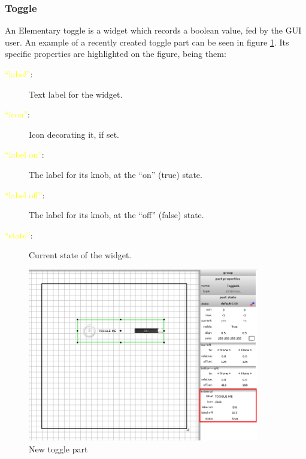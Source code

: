 \documentclass[a4paper]{profusion}
\newcommand{\GUIEditable}[1]{\textcolor{yellow}{#1}} %
\begin{document}
\subsubsection{Toggle}

An Elementary toggle is a widget which records a boolean value, fed by the
GUI user. An example of a recently created toggle part can be seen in figure
\ref{fig:new_toggle}. Its specific properties are highlighted on the
figure, being them:

\begin{description}
  \item[\GUIEditable{``label''}:] Text label for the widget.
  \item[\GUIEditable{``icon''}:] Icon decorating it, if set.
  \item[\GUIEditable{``label on''}:] The label for its knob, at the
    ``on'' (true) state.
  \item[\GUIEditable{``label off''}:] The label for its knob, at the
    ``off'' (false) state.
  \item[\GUIEditable{``state''}:] Current state of the widget.
\end{description}

\begin{figure}[h!]
  \centering
  \includegraphics[width=0.9\textwidth]{images/new_toggle.png}
  \caption{New toggle part}
  \label{fig:new_toggle}
\end{figure}

\end{document}
